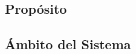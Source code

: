\documentclass{article}
\begin{document}


    \subsection{Propósito}





    \subsection{Ámbito del Sistema}













\end{document}
